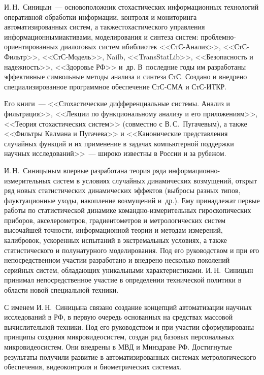\begin{multicols}{2}
     И.\,Н.~Синицын~--- основоположник стохастических информационных технологий 
оперативной обработки информации, контроля и мониторинга автоматизированных систем, а 
также\linebreak стохастического управления информационными\linebreak активами, моделирования и синтеза 
систем: проб\-лем\-но-ориен\-ти\-ро\-ван\-ных диалоговых систем и\linebreak библиотек 
     <<СтС-Ана\-лиз>>, <<СтС-Фильтр>>, <<СтС-Мо\-дель>>, Nailb, <<TransStatLib>>, 
<<Безопасность и надежность>>, <<Здоровье РФ>> и~др. В~последние годы им разработаны 
эффективные символьные методы анализа и синтеза СтС. Создано и внедрено 
специализированное программное обеспечение СтС-СМА и СтС-\mbox{ИТКР}. 
     
     Его книги~--- <<Стохастические дифференциальные системы. Анализ и фильтрация>>, 
<<Лекции по функциональному анализу и его приложениям>>, <<Теория стохастических 
систем>> (совместно с В.\,С.~Пугачевым), а также <<Фильтры Калмана и Пугачева>> и 
<<Канонические представления случайных функций и их применение в задачах компьютерной 
поддержки научных исследований>>~--- широко известны в России и за рубежом.
     
     И.\,Н.~Синицыным впервые разработана теория ряда 
     ин\-фор\-ма\-ци\-он\-но-из\-ме\-ри\-тель\-ных систем в условиях случайных динамических 
возмущений, открыт ряд новых статистических динамических эффектов (выбросы разных 
типов, флуктуационные уходы, накопление возмущений и~др.). Ему принадлежат первые 
работы по статистической динамике командно-измерительных гироскопических приборов, 
акселерометров, градиентометров и метрологических систем высочайшей точности, 
информационной теории и методам измерений, калибровок, ускоренных испытаний в 
экстремальных условиях, а также статистического и полунатурного моделирования. Под его 
руководством и при его непосредственном участии разработано и внедрено несколько 
поколений серийных систем, обла\-да\-ющих уникальными характеристиками. И.\,Н.~Синицын 
принимал непосредственное участие в определении технической политики в области новой 
специальной техники. 
     
     С именем И.\,Н.~Синицына связано создание концепций автоматизации научных 
исследований в РФ, в первую очередь основанных на средствах массовой вычислительной 
техники. Под его руководством и при участии сформулированы принципы создания 
микровидеосистем, создан ряд базовых персональных микровидеосистем. Они внедрены в МВД 
и Минздраве РФ. Достигнутые результаты получили развитие в автоматизированных системах 
метрологического обеспечения, видеоконтроля и биометрических системах. 
     

\end{multicols}
